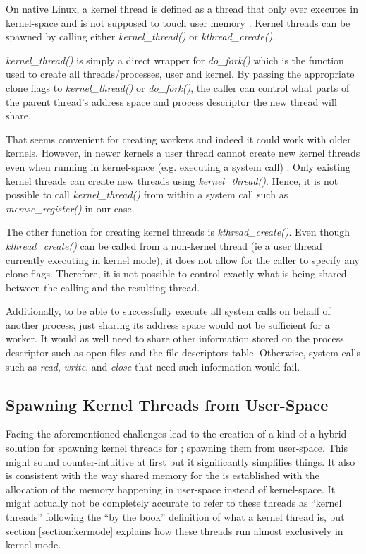 On native Linux, a kernel thread is defined as a thread that only ever executes
in kernel-space and is not supposed to touch user memory
\cite{love}\cite{bovet}. Kernel threads can be spawned by calling either
\emph{kernel\_thread()} or \emph{kthread\_create()}.

\emph{kernel\_thread()} is simply a direct wrapper for \emph{do\_fork()} which
is the function used to create all threads/processes, user and kernel. By
passing the appropriate clone flags to \emph{kernel\_thread()} or
\emph{do\_fork()}, the caller can control what parts of the parent thread's
address space and process descriptor the new thread will share.

That seems convenient for creating \memsc workers and indeed it could work with
older kernels. However, in newer kernels a user thread cannot create new kernel
threads even when running in kernel-space (e.g. executing a system call)
\cite{mail_list}. Only existing kernel threads can create new threads using
\emph{kernel\_thread()}. Hence, it is not possible to call
\emph{kernel\_thread()} from within a system call such as
\emph{memsc\_register()} in our case.

The other function for creating kernel threads is \emph{kthread\_create()}.
Even though \emph{kthread\_create()} can be called from a non-kernel thread (ie
a user thread currently executing in kernel mode), it does not allow for the
caller to specify any clone flags. Therefore, it is not possible to control
exactly what is being shared between the calling and the resulting thread.

Additionally, to be able to successfully execute all system calls on behalf of
another process, just sharing its address space would not be sufficient for a
\memsc worker. It would as well need to share other information stored on the
process descriptor such as open files and the file descriptors table.
Otherwise, system calls such as \emph{read}, \emph{write}, and \emph{close}
that need such information would fail.

\subsection{Spawning Kernel Threads from User-Space}

Facing the aforementioned challenges lead to the creation of a kind of a hybrid
solution for spawning kernel threads for \memsc; spawning them from user-space.
This might sound counter-intuitive at first but it significantly simplifies
things. It also is consistent with the way shared memory for the \sysp is
established with the allocation of the memory happening in user-space instead
of kernel-space. It might actually not be completely accurate to refer to these
threads as ``kernel threads'' following the ``by the book'' definition of what
a kernel thread is, but section \ref{section:kermode} explains how these
threads run almost exclusively in kernel mode.

